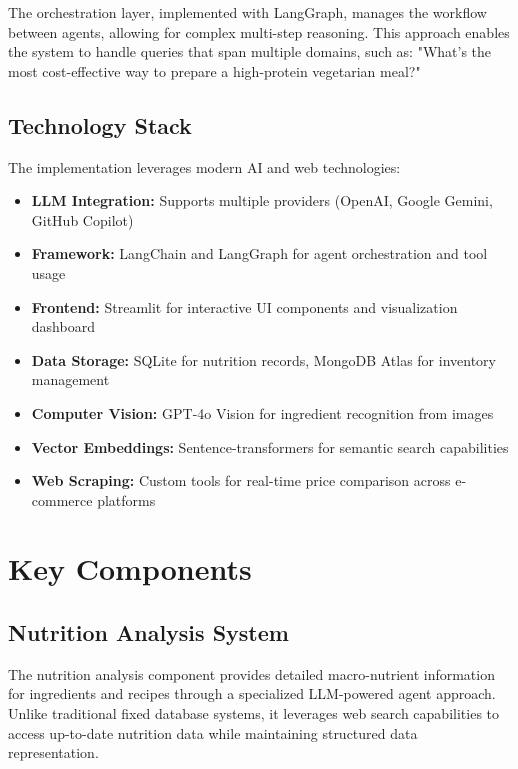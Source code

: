 \documentclass{ecai}
\begin{document}
The orchestration layer, implemented with LangGraph, manages the workflow between agents, allowing for complex multi-step reasoning. This approach enables the system to handle queries that span multiple domains, such as: "What's the most cost-effective way to prepare a high-protein vegetarian meal?"

\subsection{Technology Stack}

The implementation leverages modern AI and web technologies:

\begin{itemize}[noitemsep,topsep=0pt]
    \item \textbf{LLM Integration:} Supports multiple providers (OpenAI, Google Gemini, GitHub Copilot)
    \item \textbf{Framework:} LangChain and LangGraph for agent orchestration and tool usage
    \item \textbf{Frontend:} Streamlit for interactive UI components and visualization dashboard
    \item \textbf{Data Storage:} SQLite for nutrition records, MongoDB Atlas for inventory management
    \item \textbf{Computer Vision:} GPT-4o Vision for ingredient recognition from images
    \item \textbf{Vector Embeddings:} Sentence-transformers for semantic search capabilities
    \item \textbf{Web Scraping:} Custom tools for real-time price comparison across e-commerce platforms
\end{itemize}

\section{Key Components}

\subsection{Nutrition Analysis System}

The nutrition analysis component provides detailed macro-nutrient information for ingredients and recipes through a specialized LLM-powered agent approach. Unlike traditional fixed database systems, it leverages web search capabilities to access up-to-date nutrition data while maintaining structured data representation.
\end{document}
